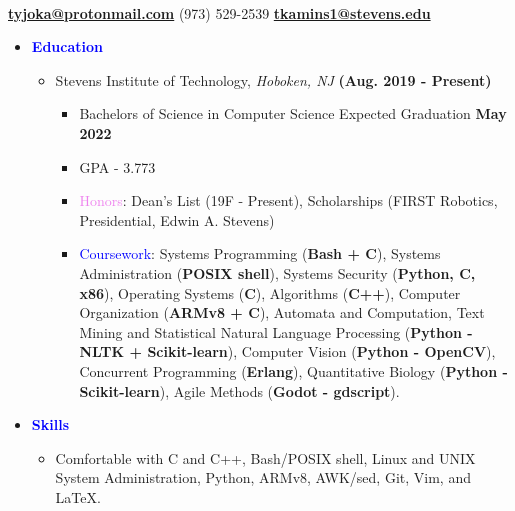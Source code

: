\documentclass[11pt]{article}
\begin{document}
\begin{flushleft}

    \makebox[\textwidth]{\LARGE \textbf{\textcolor{teal}{Tyler Kaminski}}}\\

\setlength{\parindent}{0.5in}

\begin{multicols}{2}
    \textbf{\href{mailto:tyjoka@protonmail.com}{tyjoka@protonmail.com}} \textemdash{} (973) 529-2539
    \textbf{\href{mailto:tkamins1@stevens.edu}{tkamins1@stevens.edu}}
\end{multicols}

\begin{itemize}
    \item[] \Large \textcolor{blue}{\textbf{Education}} \normalsize
        \begin{itemize}
            \item Stevens Institute of Technology, \textit{Hoboken, NJ}  \hfill{\textbf{(Aug. 2019 - Present)}}
                \begin{itemize}
                    \item Bachelors of Science in Computer Science \hfill{Expected Graduation \textbf{May 2022}}
                    \item GPA - 3.773
                    \item \textcolor{violet}{Honors}: Dean's List (19F - Present), Scholarships (FIRST Robotics, Presidential, Edwin A. Stevens)
                    \item \textcolor{blue}{Coursework}: Systems Programming (\textbf{Bash + C}), Systems Administration (\textbf{POSIX shell}), Systems Security (\textbf{Python, C, x86}), Operating Systems (\textbf{C}), Algorithms (\textbf{C++}), Computer Organization (\textbf{ARMv8 + C}), Automata and Computation, Text Mining and Statistical Natural Language Processing (\textbf{Python - NLTK + Scikit-learn}), Computer Vision (\textbf{Python - OpenCV}), Concurrent Programming (\textbf{Erlang}), Quantitative Biology (\textbf{Python - Scikit-learn}), Agile Methods (\textbf{Godot - gdscript}).
                \end{itemize}
        \end{itemize}
    \item[] \Large \textcolor{blue}{\textbf{Skills}} \normalsize
        \begin{itemize}
            \item Comfortable with C and C++, Bash/POSIX shell, Linux and UNIX System Administration, Python, ARMv8, AWK/sed, Git, Vim, and LaTeX.

\end{itemize}
\end{itemize}
\end{flushleft}
\end{document}
